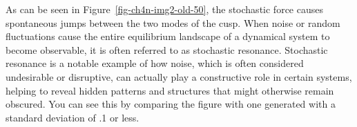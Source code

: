 \documentclass[
  a4paper,
  DIV=11,
  numbers=noendperiod,
  oneside]{scrreprt}
\newenvironment{Shaded}{\begin{snugshade}}{\end{snugshade}}
\newcommand{\AttributeTok}[1]{\textcolor[rgb]{0.40,0.45,0.13}{#1}}
\newcommand{\DecValTok}[1]{\textcolor[rgb]{0.68,0.00,0.00}{#1}}
\newcommand{\FunctionTok}[1]{\textcolor[rgb]{0.28,0.35,0.67}{#1}}
\newcommand{\NormalTok}[1]{\textcolor[rgb]{0.00,0.23,0.31}{#1}}
\newcommand{\OtherTok}[1]{\textcolor[rgb]{0.00,0.23,0.31}{#1}}
\newcommand{\SpecialCharTok}[1]{\textcolor[rgb]{0.37,0.37,0.37}{#1}}
\newcommand{\StringTok}[1]{\textcolor[rgb]{0.13,0.47,0.30}{#1}}
\begin{document}
As can be seen in Figure~\ref{fig-ch4n-img2-old-50}, the stochastic
force causes spontaneous jumps between the two modes of the cusp. When
noise or random fluctuations cause the entire equilibrium landscape of a
dynamical system to become observable, it is often referred to as
stochastic resonance. Stochastic resonance is a notable example of how
noise, which is often considered undesirable or disruptive, can actually
play a constructive role in certain systems, helping to reveal hidden
patterns and structures that might otherwise remain obscured. You can
see this by comparing the figure with one generated with a standard
deviation of .1 or less.

\begin{Shaded}
\end{Shaded}
\end{document}

